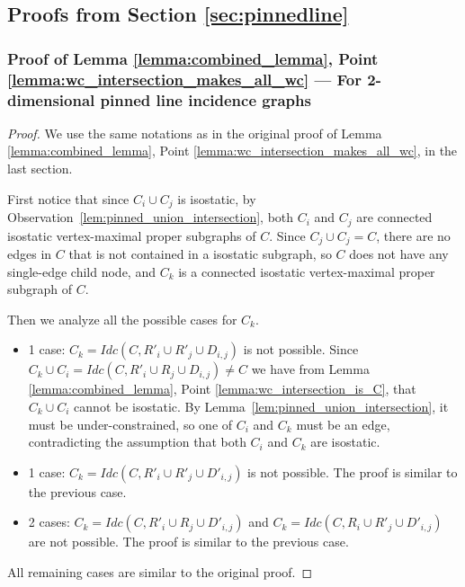 \subsection{Proofs from Section \ref{sec:pinnedline}}
\subsubsection{Proof of Lemma \ref{lemma:combined_lemma}, Point \ref{lemma:wc_intersection_makes_all_wc} --- For 2-dimensional pinned line incidence graphs}
\label{sec:appendix_pinned}

\begin{proof} %
We use the same notations as in the original proof of Lemma \ref{lemma:combined_lemma}, Point \ref{lemma:wc_intersection_makes_all_wc}, in the last section.

First notice that since $C_i \cup C_j$ is isostatic, by Observation~\ref{lem:pinned_union_intersection},
both $C_i$ and $C_j$ are connected isostatic vertex-maximal proper subgraphs of  $C$.
Since $C_j \cup C_j = C$, there are no edges in $C$ that is not contained in a isostatic subgraph, so $C$ does not have any single-edge child node, and $C_k$ is a connected isostatic vertex-maximal proper subgraph of  $C$.

Then we analyze all the possible cases for $C_k$.
\begin{itemize}
    \item 1 case: $C_k=Idc(C,R'_i\cup R'_j\cup D_{i,j})$ is not possible. Since $C_k\cup C_i = Idc(C,R'_i\cup R_j\cup D_{i,j})\neq C$ we have from Lemma \ref{lemma:combined_lemma}, Point \ref{lemma:wc_intersection_is_C}, that $C_k\cup C_i$ cannot be isostatic.
    By Lemma~\ref{lem:pinned_union_intersection}, it must be under-constrained,
    so one of $C_i$ and $C_k$ must be an edge, contradicting the assumption that both $C_i$ and $C_k$ are isostatic.

    \item 1 case: $C_k=Idc(C,R'_i\cup R'_j\cup D'_{i,j})$ is not possible. The proof is similar to the previous case.

    \item 2 cases: $C_k=Idc(C,R'_i\cup R_j\cup D'_{i,j})$ and $C_k=Idc(C,R_i\cup R'_j\cup D'_{i,j})$ are not possible.
    The proof is similar to the previous case.
\end{itemize}

All remaining cases are similar to the original proof.
\end{proof}

